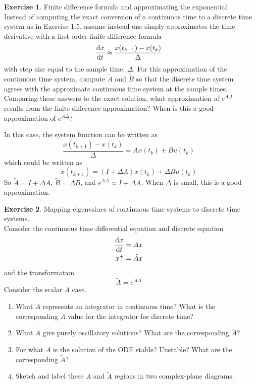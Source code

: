 \documentclass[11pt,a4paper]{report}
\theoremstyle{definition}\newtheorem{exercise}{Exercise}[chapter]
\begin{document}
\begin{exercise}Finite difference formula and approximating the exponential.\\
Instead of computing the exact conversion of a continuous time to a discrete time system as in Exercise 1.5, assume instead one simply approximates the time derivative with a first-order finite difference formula
\begin{equation}
    \dv{x}{t}\approx\dfrac{x(t_{k-1})-x(t_k)}{\Delta}
\end{equation}
with  step size equal to the sample time, $\Delta$. For this approximation of the continuous time system, compute $\tilde A$ and $\tilde B$ so that the discrete time system agrees with the approximate continuous time system at the sample times. Comparing these answers to the exact solution, what approximation of $e^{A\Delta}$ results from the finite difference approximation? When is this a good approximation of $e^{A\Delta}$?
\end{exercise}

\begin{answer}
In this case, the system function can be written as 
\begin{equation}
    \dfrac{x(t_{k+1})-x(t_k)}{\Delta}=Ax(t_k)+Bu(t_k)
\end{equation} 
which could be written as
\begin{equation}
    x(t_{k+1})=(I+\Delta A)x(t_k)+\Delta Bu(t_k)
\end{equation}
So $\tilde A=I+\Delta A$, $\tilde B=\Delta B$, and $e^{A\Delta}\approx I+\Delta A$. When $\Delta$ is small, this is a good approximation.
\end{answer}

\begin{exercise}Mapping eigenvalues of continuous time systems to discrete time systems.\\
Consider the continuous time differential equation and discrete equation
\begin{align}
    \dv{x}{t}&=Ax\\
    x^+&=\tilde Ax
\end{align}
and the transformation
\begin{equation}
    \tilde A=e^{A\Delta}
\end{equation}
Consider the scalar $A$ case.
\begin{enumerate}[label=(\alph*)]
    \item What $A$ represents an integrator in continuous time? What is the corresponding $A$ value for the integrator for discrete time?
    \item What $A$ give purely oscillatory solutions? What are the corresponding $\tilde A$?
    \item For what $A$ is the solution of the ODE stable? Unstable? What are the corresponding $\tilde A$?
    \item Sketch and label these $A$ and $\tilde A$ regions in two complex-plane diagrams.
\end{enumerate}
\end{exercise}
\end{document}
